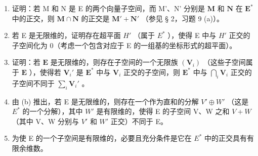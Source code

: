 \begin{enumerate}
\def\labelenumi{(\alph{enumi})}
\item
  证明：若 M 和 N 是 E 的两个向量子空间，而 M'、N' 分别是 \(\mathbf{M}\) 和 \(\mathbf{N}\) 在 \(\mathbf{E}^*\) 中的正交，则 \(\mathbf{M} \cap \mathbf{N}\) 的正交是 \(\mathbf{M}' + \mathbf{N}'\) （参见 § 2，习题 9 (a)）。
\item
  若 E 是无限维的，证明存在超平面 \(H'\) （属于 \(E^{*}\) ），使得 E 中与 \(H'\) 正交的子空间化为 0（考虑一个包含对应于 E 的一组基的坐标形式的超平面）。
\item
  证明：若 \(\mathbf{E}\) 是无限维的，则存在子空间的一个无限族 \((\mathbf{V}_i)\) （这些子空间属于 \(\mathbf{E}\) ），使得若 \(\mathbf{V}_i'\) 是 \(\mathbf{E}^*\) 中与 \(\mathbf{V}_i\) 正交的子空间，则 \(\mathbf{E}^*\) 中与 \(\bigcap_{i} \mathbf{V}_i\) 正交的子空间不同于 \(\sum_{i} \mathbf{V}_i'\) 。
\item
  由 (b) 推出，若 E 是无限维的，则存在一个作为直和的分解 \(V' \oplus W'\) （这是 \(E^{*}\) 的一个分解），其中 \(W'\) 是有限维的，使得 E 的子空间 V、W 之和 \(V + W\) （其中 V、W 分别与 \(V'\) 和 \(W'\) 正交）不同于 E。
\item
  为使 E 的一个子空间是有限维的，必要且充分条件是它在 \(E^{*}\) 中的正交具有有限余维数。
\end{enumerate}


